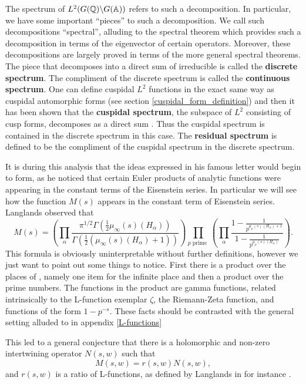 The spectrum of \(L^2(G(\Q)\backslash G(\A))\) refers to such a decomposition. In particular, we have some important ``pieces'' to such a decomposition. We call such decompositions ``spectral'', alluding to the spectral theorem which provides such a decomposition in terms of the eigenvector of certain operators. Moreover, these decompositions are largely proved in terms of the more general spectral theorems. The piece that decomposes into a direct sum of irreducible is called the \textbf{discrete spectrum}. The compliment of the discrete spectrum is called the \textbf{continuous spectrum}. One can define cuspidal \(L^2\) functions in the exact same way as cuspidal automorphic forms (see section \ref{cuspidal_form_definition}) and then it has been shown that the \textbf{cuspidal spectrum}, the subspace of \(L^2\) consisting of cusp forms, decomposes as a direct sum \cite[9]{getzIntroductionAutomorphicRepresentations2024}. Thus the cuspidal spectrum is contained in the discrete spectrum in this case. The \textbf{residual spectrum} is defined to be the compliment of the cuspidal spectrum in the discrete spectrum. 

It is during this analysis that the ideas expressed in his famous letter \cite{langlandsLetterAndreWeil1967} would begin to form, as he noticed that certain Euler products of analytic functions were appearing in the constant terms of the Eisenstein series. In particular we will see how the function \(M(s)\) appears in the constant term of Eisenstein series. Langlands observed that \cite{langlandsEulerProducts1971} 
\[M(s) = \left( \prod_\alpha\frac{\pi^{1/2}\Gamma(\frac{1}{2}\mu_\infty(s)(H_\alpha))}{\Gamma(\frac{1}{2}(\mu_\infty(s)(H_\alpha) + 1))} \right)
\prod_{p \text{ prime }} \left( \prod_\alpha 
\frac{1 -\frac{1}{ p^{\mu_p(s)(H_\alpha) + 1}}}{1 - \frac{1}{p^{\mu_p(s)(H_\alpha) }}}\right).\]
This formula is obviously uninterpretable without further definitions, however we just want to point out some things to notice. First there is a product over the places of \Q, namely one item for the infinite place and then a product over the prime numbers. The functions in the product are gamma functions, related intrinsically to the L-function exemplar \(\zeta\), the Riemann-Zeta function, and functions of the form \(1 - p^{-s}\). These facts should be contrasted with the general setting alluded to in appendix \ref{L-functions}

This led to a general conjecture that there is a holomorphic and non-zero intertwining operator \(N(s, w)\) such that 
\[M(s, w) = r(s, w)N(s,w),\]
and \(r(s, w)\) is a ratio of L-functions, as defined by Langlands in for instance \cite{langlandsEulerProducts1971}.

